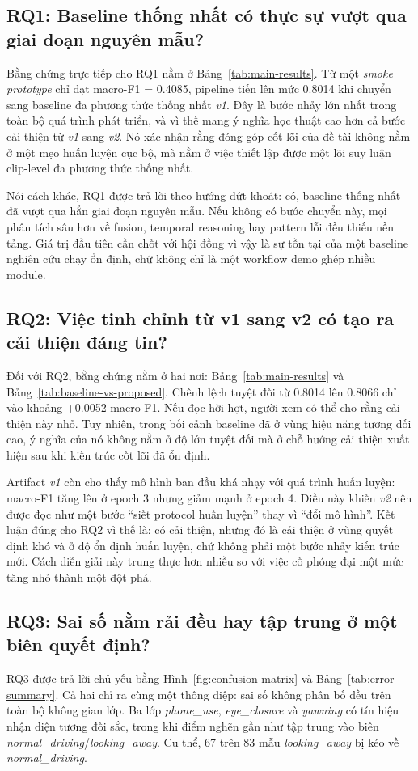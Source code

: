 \documentclass[conference,a4paper]{IEEEtran}
\begin{document}
\subsection{RQ1: Baseline thống nhất có thực sự vượt qua giai đoạn nguyên mẫu?}
Bằng chứng trực tiếp cho RQ1 nằm ở Bảng~\ref{tab:main-results}. Từ một \textit{smoke prototype} chỉ đạt macro-F1 = 0.4085, pipeline tiến lên mức 0.8014 khi chuyển sang baseline đa phương thức thống nhất \textit{v1}. Đây là bước nhảy lớn nhất trong toàn bộ quá trình phát triển, và vì thế mang ý nghĩa học thuật cao hơn cả bước cải thiện từ \textit{v1} sang \textit{v2}. Nó xác nhận rằng đóng góp cốt lõi của đề tài không nằm ở một mẹo huấn luyện cục bộ, mà nằm ở việc thiết lập được một lõi suy luận clip-level đa phương thức thống nhất.

Nói cách khác, RQ1 được trả lời theo hướng dứt khoát: có, baseline thống nhất đã vượt qua hẳn giai đoạn nguyên mẫu. Nếu không có bước chuyển này, mọi phân tích sâu hơn về fusion, temporal reasoning hay pattern lỗi đều thiếu nền tảng. Giá trị đầu tiên cần chốt với hội đồng vì vậy là sự tồn tại của một baseline nghiên cứu chạy ổn định, chứ không chỉ là một workflow demo ghép nhiều module.

\subsection{RQ2: Việc tinh chỉnh từ v1 sang v2 có tạo ra cải thiện đáng tin?}
Đối với RQ2, bằng chứng nằm ở hai nơi: Bảng~\ref{tab:main-results} và Bảng~\ref{tab:baseline-vs-proposed}. Chênh lệch tuyệt đối từ 0.8014 lên 0.8066 chỉ vào khoảng +0.0052 macro-F1. Nếu đọc hời hợt, người xem có thể cho rằng cải thiện này nhỏ. Tuy nhiên, trong bối cảnh baseline đã ở vùng hiệu năng tương đối cao, ý nghĩa của nó không nằm ở độ lớn tuyệt đối mà ở chỗ hướng cải thiện xuất hiện sau khi kiến trúc cốt lõi đã ổn định.

Artifact \textit{v1} còn cho thấy mô hình ban đầu khá nhạy với quá trình huấn luyện: macro-F1 tăng lên ở epoch 3 nhưng giảm mạnh ở epoch 4. Điều này khiến \textit{v2} nên được đọc như một bước ``siết protocol huấn luyện'' thay vì ``đổi mô hình''. Kết luận đúng cho RQ2 vì thế là: có cải thiện, nhưng đó là cải thiện ở vùng quyết định khó và ở độ ổn định huấn luyện, chứ không phải một bước nhảy kiến trúc mới. Cách diễn giải này trung thực hơn nhiều so với việc cố phóng đại một mức tăng nhỏ thành một đột phá.

\subsection{RQ3: Sai số nằm rải đều hay tập trung ở một biên quyết định?}
RQ3 được trả lời chủ yếu bằng Hình~\ref{fig:confusion-matrix} và Bảng~\ref{tab:error-summary}. Cả hai chỉ ra cùng một thông điệp: sai số không phân bố đều trên toàn bộ không gian lớp. Ba lớp \textit{phone\_use}, \textit{eye\_closure} và \textit{yawning} có tín hiệu nhận diện tương đối sắc, trong khi điểm nghẽn gần như tập trung vào biên \textit{normal\_driving}/\textit{looking\_away}. Cụ thể, 67 trên 83 mẫu \textit{looking\_away} bị kéo về \textit{normal\_driving}.
\end{document}
